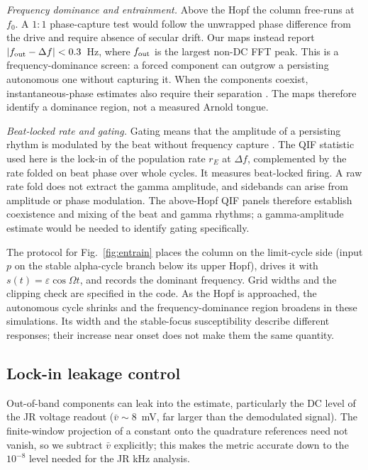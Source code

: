 \documentclass[11pt,a4paper]{article}
\newif\ifjne
\begin{document}
\emph{Frequency dominance and entrainment.} Above the Hopf the column free-runs
at $f_0$. A $1{:}1$ phase-capture test would follow the unwrapped phase difference
from the drive and require absence of secular drift. Our maps instead report
$|f_{\rm out}-\Delta f|<0.3$~Hz, where $f_{\rm out}$ is the largest non-DC FFT
peak. This is a frequency-dominance screen: a forced component can outgrow a
persisting autonomous one without capturing it. When the components coexist,
instantaneous-phase estimates also require their separation
\cite{lachaux1999}. The maps therefore identify a dominance region, not a
measured Arnold tongue.

\emph{Beat-locked rate and gating.} Gating means that the amplitude of a
persisting rhythm is modulated by the beat without frequency capture
\cite{canolty2010,tort2010}. The QIF statistic used here is the lock-in of the
population rate $r_E$ at $\Delta f$, complemented by the rate folded on beat
phase over whole cycles. It measures beat-locked firing. A raw rate fold does
not extract the gamma amplitude, and sidebands can arise from amplitude or phase
modulation. The above-Hopf QIF panels therefore establish coexistence and mixing
of the beat and gamma rhythms; a gamma-amplitude estimate would be needed to
identify gating specifically.

The protocol for Fig.~\ref{fig:entrain} places the column on the limit-cycle side
(input $p$ on the stable alpha-cycle branch below its upper Hopf), drives it
with $s(t)=\varepsilon\cos\Omega t$, and records the dominant frequency. Grid
widths and the clipping check are specified in the code. As the Hopf is approached,
the autonomous cycle shrinks and the frequency-dominance region broadens in these
simulations. Its width and the stable-focus susceptibility describe different
responses; their increase near onset does not make them the same quantity.

\ifjne
\subsection{Lock-in leakage control}\label{supp:lockin}
Out-of-band components can leak into the estimate, particularly the DC level of the JR voltage readout ($\bar v\!\sim\!8$~mV, far
larger than the demodulated signal). The finite-window projection of a constant onto the quadrature references
need not vanish, so we subtract $\bar v$ explicitly; this makes the metric
accurate down to the $10^{-8}$ level needed for the JR kHz
analysis.
\end{document}
